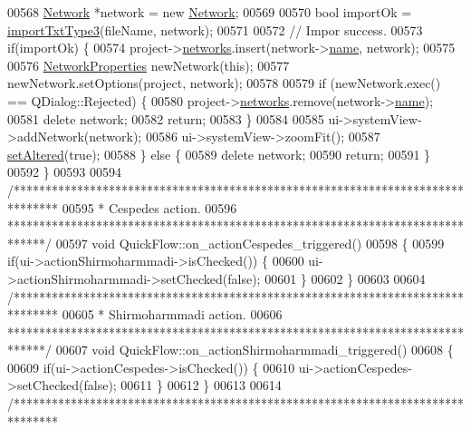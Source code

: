 \begin{DoxyCode}
00568   \hyperlink{class_network}{Network} *network = \textcolor{keyword}{new} \hyperlink{class_network}{Network};
00569 
00570   \textcolor{keywordtype}{bool} importOk = \hyperlink{import_8cpp_acd1a54d4b2a28043b1489f0be7423ecd}{importTxtType3}(fileName, network);
00571 
00572   \textcolor{comment}{// Impor success.}
00573   \textcolor{keywordflow}{if}(importOk) \{
00574     project->\hyperlink{class_project_aa98126154cab59769a431668e6f17daf}{networks}.insert(network->\hyperlink{class_network_ab6643733a517f930c60b06f5ffd78186}{name}, network);
00575 
00576     \hyperlink{class_network_properties}{NetworkProperties} newNetwork(\textcolor{keyword}{this});
00577     newNetwork.setOptions(project, network);
00578 
00579     \textcolor{keywordflow}{if} (newNetwork.exec() == QDialog::Rejected) \{
00580       project->\hyperlink{class_project_aa98126154cab59769a431668e6f17daf}{networks}.remove(network->\hyperlink{class_network_ab6643733a517f930c60b06f5ffd78186}{name});
00581       \textcolor{keyword}{delete} network;
00582       \textcolor{keywordflow}{return};
00583     \}
00584 
00585     ui->systemView->addNetwork(network);
00586     ui->systemView->zoomFit();
00587     \hyperlink{group___window_ga4b63ea5ca52a9eea14db0a22b5a133f8}{setAltered}(\textcolor{keyword}{true});
00588   \} \textcolor{keywordflow}{else} \{
00589     \textcolor{keyword}{delete} network;
00590     \textcolor{keywordflow}{return};
00591   \}
00592 \}
00593 
00594 \textcolor{comment}{/*******************************************************************************}
00595 \textcolor{comment}{ * Cespedes action.}
00596 \textcolor{comment}{ ******************************************************************************/}
00597 \textcolor{keywordtype}{void} QuickFlow::on\_actionCespedes\_triggered()
00598 \{
00599   \textcolor{keywordflow}{if}(ui->actionShirmoharmmadi->isChecked()) \{
00600     ui->actionShirmoharmmadi->setChecked(\textcolor{keyword}{false});
00601   \}
00602 \}
00603 
00604 \textcolor{comment}{/*******************************************************************************}
00605 \textcolor{comment}{ * Shirmoharmmadi action.}
00606 \textcolor{comment}{ ******************************************************************************/}
00607 \textcolor{keywordtype}{void} QuickFlow::on\_actionShirmoharmmadi\_triggered()
00608 \{
00609   \textcolor{keywordflow}{if}(ui->actionCespedes->isChecked()) \{
00610     ui->actionCespedes->setChecked(\textcolor{keyword}{false});
00611   \}
00612 \}
00613 
00614 \textcolor{comment}{/*******************************************************************************}

\end{DoxyCode}

